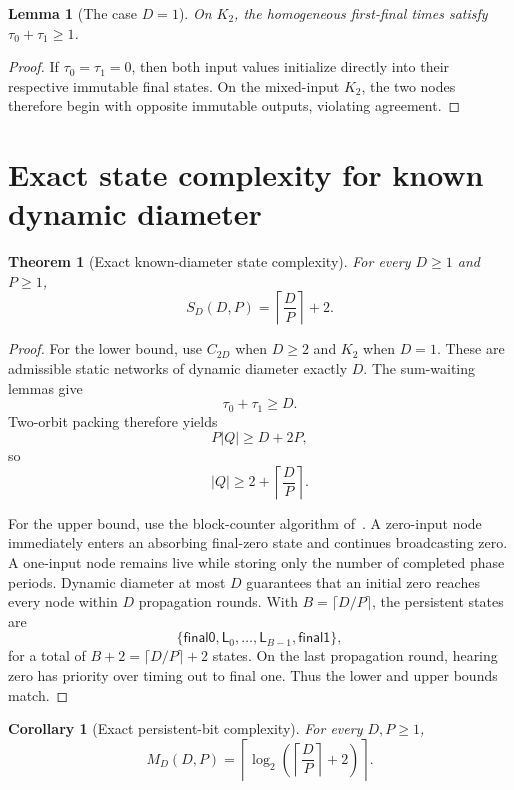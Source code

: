 \documentclass[11pt]{article}
\newtheorem{theorem}{Theorem}
\newtheorem{lemma}{Lemma}
\newtheorem{corollary}{Corollary}
\theoremstyle{remark}
\newcommand{\finalzero}{\mathsf{final0}}
\newcommand{\finalone}{\mathsf{final1}}
\newcommand{\live}{\mathsf{L}}
\begin{document}
\begin{lemma}[The case $D=1$]
On $K_2$, the homogeneous first-final times satisfy $\tau_0+\tau_1\ge1$.
\end{lemma}

\begin{proof}
If $\tau_0=\tau_1=0$, then both input values initialize directly into their respective immutable final states.  On the mixed-input $K_2$, the two nodes therefore begin with opposite immutable outputs, violating agreement.
\end{proof}

\section{Exact state complexity for known dynamic diameter}

\begin{theorem}[Exact known-diameter state complexity]
For every $D\ge1$ and $P\ge1$,
\[
\boxed{S_D(D,P)=\left\lceil\frac{D}{P}\right\rceil+2.}
\]
\end{theorem}

\begin{proof}
For the lower bound, use $C_{2D}$ when $D\ge2$ and $K_2$ when $D=1$.  These are admissible static networks of dynamic diameter exactly $D$.  The sum-waiting lemmas give
\[
\tau_0+\tau_1\ge D.
\]
Two-orbit packing therefore yields
\[
P|Q|\ge D+2P,
\]
so
\[
|Q|\ge 2+\left\lceil\frac{D}{P}\right\rceil.
\]

For the upper bound, use the block-counter algorithm of~\cite{yonezu2026statephase}.  A zero-input node immediately enters an absorbing final-zero state and continues broadcasting zero.  A one-input node remains live while storing only the number of completed phase periods.  Dynamic diameter at most $D$ guarantees that an initial zero reaches every node within $D$ propagation rounds.  With $B=\lceil D/P\rceil$, the persistent states are
\[
\{\finalzero,\live_0,\ldots,\live_{B-1},\finalone\},
\]
for a total of $B+2=\lceil D/P\rceil+2$ states.  On the last propagation round, hearing zero has priority over timing out to final one.  Thus the lower and upper bounds match.
\end{proof}

\begin{corollary}[Exact persistent-bit complexity]
For every $D,P\ge1$,
\[
M_D(D,P)=
\left\lceil
\log_2\!\left(\left\lceil\frac{D}{P}\right\rceil+2\right)
\right\rceil.
\]
\end{corollary}
\end{document}

